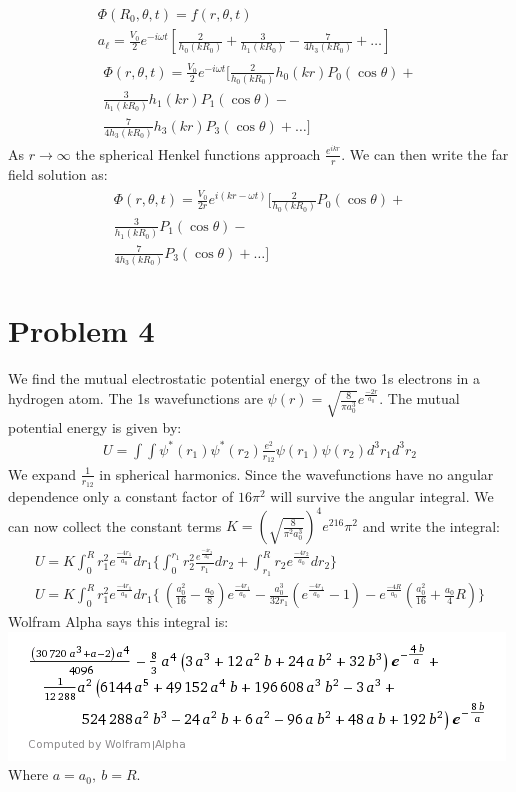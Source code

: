 \documentclass[a4paper,12pt]{article}
\numberwithin{equation}{section}
\begin{document}
\begin{gather}
 \Phi(R_0,\theta, t) = f(r,\theta, t)\\
 a_{\ell}=\frac{V_0}{2}e^{-i\omega t}[\frac{2}{h_0(kR_0)}+\frac{3}{h_1(kR_0)}-\frac{7}{4h_3(kR_0)}+\ldots]\\
 \begin{aligned}
 \Phi(r,\theta,t)=\frac{V_0}{2}e^{-i\omega t}[\frac{2}{h_0(kR_0)}h_0(kr)P_0(\cos \theta)+ \\
	      \frac{3}{h_1(kR_0)}h_1(kr)P_1(\cos \theta)-\\ 
	      \frac{7}{4h_3(kR_0)}h_3(kr)P_3(\cos \theta)+\ldots]
 \end{aligned}
\end{gather}
As $r\rightarrow \infty$ the spherical Henkel functions approach $\frac{e^{ikr}}{r}$. 
We can then write the far field solution as:
\begin{gather}
  \begin{aligned}
 \Phi(r,\theta,t)=\frac{V_0}{2r}e^{i(kr-\omega t)}[\frac{2}{h_0(kR_0)}P_0(\cos \theta)+ \\
	      \frac{3}{h_1(kR_0)}P_1(\cos \theta)-\\ 
	      \frac{7}{4h_3(kR_0)}P_3(\cos \theta)+\ldots]
 \end{aligned}
\end{gather}


\section{Problem 4}
We find the mutual electrostatic potential energy of the two 1s electrons in a hydrogen atom.
The 1s wavefunctions are $\psi(r)=\sqrt{\frac{8}{\pi a_0^3}}e^{\frac{-2r}{a_0}}$.
The mutual potential energy is given by:
\begin{gather}
 U=\int\int\psi^*(r_1)\psi^*(r_2)\frac{e^2}{r_{12}}\psi(r_1)\psi(r_2) d^3r_1 d^3r_2
\end{gather}
We expand $\frac{1}{r_{12}}$ in spherical harmonics. 
Since the wavefunctions have no angular dependence only a constant factor of $16\pi^2$ will survive the angular integral.
We can now collect the constant terms $K=(\sqrt{\frac{8}{\pi^2 a_0^3}})^4e^216\pi^2$ and write the integral:
\begin{gather}
 U=K \int_{0}^{R} r_1^2 e^{\frac{-4r_1}{a_0}}dr_1\{\int_{0}^{r_1} r_2^2\frac{ e^{\frac{-4r_2}{a_0}} }{r_1} dr_2
 + \int_{r_1}^{R} r_2 e^{\frac{-4r_2}{a_0}}  dr_2\}\\
 U=K \int_{0}^{R} r_1^2 e^{\frac{-4r_1}{a_0}}dr_1\{\ (\frac{a_0^2}{16}-\frac{a_0}{8} )e^{\frac{-4r_1}{a_0}} 
 -\frac{a_0^3}{32r_1}(e^{\frac{-4r_1}{a_0}}-1 )-e^{\frac{-4R}{a_0}}(\frac{a_0^2}{16}+\frac{a_0}{4}R) \}
\end{gather}
Wolfram Alpha says this integral is:\\
\includegraphics{BigEq2}
\\
Where $a=a_0,\ b=R$.
\end{document}

